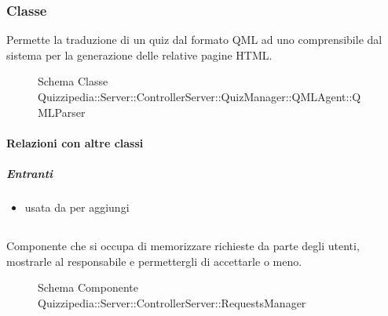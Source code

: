 \subsubsection{Classe }
Permette la traduzione di un quiz dal formato QML ad uno comprensibile dal sistema per la generazione delle relative pagine HTML.
\begin{figure}[H]
\centering
\noindent{}
\caption[Schema Classe QMLParser]{Schema Classe Quizzipedia::Server::ControllerServer::QuizManager::QMLAgent::QMLParser}
\end{figure}
\paragraph{Relazioni con altre classi}
\subparagraph{Entranti}
\begin{itemize}
\item usata da  per aggiungi
\end{itemize}
\subsection{}
Componente che si occupa di memorizzare richieste da parte degli utenti, mostrarle al responsabile e permettergli di accettarle o meno.
\begin{figure}[H]
\centering
\noindent{}
\caption[Schema Componente Quizzipedia::Server::ControllerServer::RequestsManager]{Schema Componente Quizzipedia::Server::ControllerServer::RequestsManager}
\end{figure}
